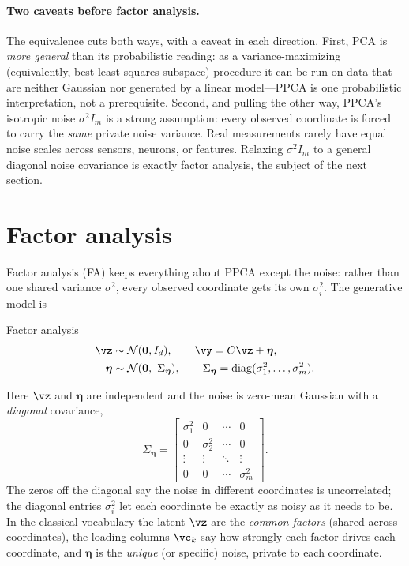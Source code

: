 \documentclass[11pt]{article}
\theoremstyle{plain}
\theoremstyle{definition}
\theoremstyle{remark}
\theoremstyle{definition}
\newcommand{\veta}{\bm{\eta}}
\newcommand{\Normal}{\mathcal{N}}
\begin{document}
\paragraph{Two caveats before factor analysis.}
The equivalence cuts both ways, with a caveat in each direction. First, PCA is
\emph{more general} than its probabilistic reading: as a variance-maximizing
(equivalently, best least-squares subspace) procedure it can be run on data that
are neither Gaussian nor generated by a linear model---PPCA is one probabilistic
interpretation, not a prerequisite. Second, and pulling the other way, PPCA's
isotropic noise $\sigma^2 I_m$ is a strong assumption: every observed coordinate is
forced to carry the \emph{same} private noise variance. Real measurements rarely
have equal noise scales across sensors, neurons, or features.
Relaxing $\sigma^2 I_m$ to a general diagonal noise covariance is exactly factor
analysis, the subject of the next section.

\section{Factor analysis}\label{sec:fa}

Factor analysis (FA) keeps everything about PPCA except the noise: rather than one
shared variance $\sigma^2$, every observed coordinate gets its own $\sigma_i^2$.
The generative model is
\begin{genmodel}{Factor analysis}
\begin{align}
    \vz &\sim \Normal(\mathbf 0, I_d), \qquad \vy = C\vz + \veta, \label{eq:fa-latent}\\
    \veta &\sim \Normal(\mathbf 0,\ \Sigma_{\veta}), \qquad
    \Sigma_{\veta} = \diag(\sigma_1^2, \dots, \sigma_m^2). \label{eq:fa-obs}
\end{align}
\end{genmodel}
Here $\vz$ and $\veta$ are independent and the noise is zero-mean Gaussian with a
\emph{diagonal} covariance,
\begin{equation}
    \Sigma_{\veta} =
    \begin{bmatrix}
        \sigma_1^2 & 0 & \cdots & 0 \\
        0 & \sigma_2^2 & \cdots & 0 \\
        \vdots & \vdots & \ddots & \vdots \\
        0 & 0 & \cdots & \sigma_m^2
    \end{bmatrix}.
\end{equation}
The zeros off the diagonal say the noise in different coordinates is
uncorrelated; the diagonal entries $\sigma_i^2$ let each coordinate be exactly as
noisy as it needs to be. In the classical vocabulary the latent $\vz$ are the
\emph{common factors} (shared across coordinates), the loading columns
$\vc_k$ say how strongly each factor drives each coordinate, and $\veta$ is the
\emph{unique} (or specific) noise, private to each coordinate.
\end{document}
